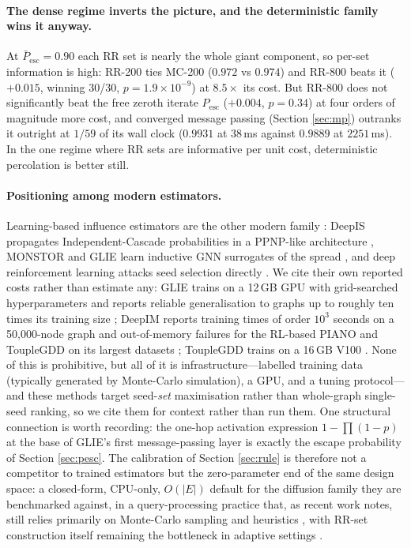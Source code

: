 \documentclass[11pt,a4paper]{article}
\newcommand{\Pesc}{P_{\mathrm{esc}}}
\newcommand{\Pescbar}{\bar{P}_{\mathrm{esc}}}
\begin{document}
\paragraph{The dense regime inverts the picture, and the deterministic family
wins it anyway.} At $\Pescbar=0.90$ each RR set is nearly the whole giant
component, so per-set information is high: RR-200 ties MC-200 ($0.972$ vs
$0.974$) and RR-800 beats it ($+0.015$, winning 30/30, $p=1.9\times10^{-9}$)
at $8.5\times$ its cost. But RR-800 does not significantly beat the free
zeroth iterate $\Pesc$ ($+0.004$, $p=0.34$) at four orders of magnitude more
cost, and converged message passing (Section \ref{sec:mp}) outranks it
outright at $1/59$ of its wall clock ($0.9931$ at $38$\,ms against $0.9889$ at
$2251$\,ms). In the one regime where RR sets are informative per unit cost,
deterministic percolation is better still.

\paragraph{Positioning among modern estimators.} Learning-based influence
estimators are the other modern family \cite{li23survey}: DeepIS propagates
Independent-Cascade probabilities in a PPNP-like architecture \cite{deepis21},
MONSTOR and GLIE learn inductive GNN surrogates of the spread
\cite{monstor20,glie23,ling23,chowdhury24}, and deep reinforcement learning
attacks seed selection directly \cite{piano23,touplegdd24}. We cite their own
reported costs rather than estimate any: GLIE trains on a 12\,GB GPU with
grid-searched hyperparameters and reports reliable generalisation to graphs up
to roughly ten times its training size \cite{glie23}; DeepIM reports training
times of order $10^3$ seconds on a 50{,}000-node graph and out-of-memory
failures for the RL-based PIANO and ToupleGDD on its largest datasets
\cite{ling23}; ToupleGDD trains on a 16\,GB V100 \cite{touplegdd24}. None of
this is prohibitive, but all of it is infrastructure---labelled training data
(typically generated by Monte-Carlo simulation), a GPU, and a tuning
protocol---and these methods target seed-\emph{set} maximisation rather than
whole-graph single-seed ranking, so we cite them for context rather than run
them. One structural connection is worth recording: the one-hop activation
expression $1-\prod(1-p)$ at the base of GLIE's first message-passing layer
\cite{glie23} is exactly the escape probability of Section \ref{sec:pesc}.
The calibration of Section \ref{sec:rule} is therefore not a competitor to
trained estimators but the zero-parameter end of the same design space: a
closed-form, CPU-only, $O(|E|)$ default for the diffusion family they are
benchmarked against, in a query-processing practice that, as recent work
notes, still relies primarily on Monte-Carlo sampling and heuristics
\cite{wang24}, with RR-set construction itself remaining the bottleneck in
adaptive settings \cite{guo23}.
\end{document}
